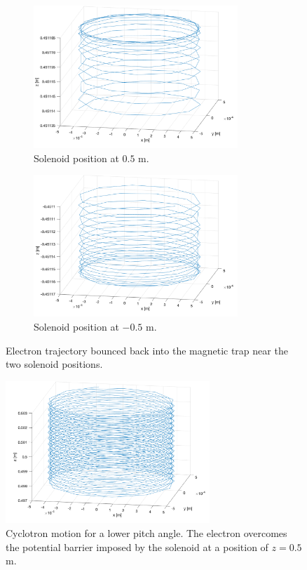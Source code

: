 \documentclass[a4paper,12pt, notitlepage]{article}
\begin{document}
\begin{figure}[t!]
    \centering
    \begin{subfigure}[b]{0.45\textwidth}
        \includegraphics[width=77mm]{pictures/cyclotronMotion2.png}
        \caption{Solenoid position at $0.5$ m.}
        \label{fig:cycloBounce1}
    \end{subfigure} 
    \quad
    \begin{subfigure}[b]{0.45\textwidth}
        \includegraphics[width=77mm]{pictures/cyclotronMotion3.png}
        \caption{Solenoid position at $-0.5$ m.}
        \label{fig:cycloBounce2}
    \end{subfigure}
\caption{Electron trajectory bounced back into the magnetic trap near the two solenoid positions.}
\label{fig:cyclo2}
\end{figure}

\begin{figure}[t!]
\centering
\includegraphics[width=77mm]{pictures/cyclotronMotion4.png}
\vspace{-2mm}
\caption{Cyclotron motion for a lower pitch angle. The electron overcomes the potential barrier imposed by the solenoid at a position of $z = 0.5$ m.}
\label{fig:cyclo4}
\end{figure}
\end{document}
